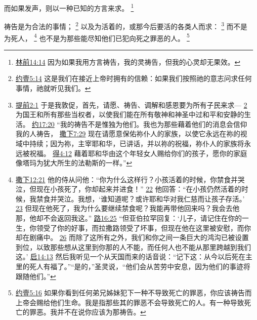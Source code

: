 \documentclass[12pt, a4paper, oneside]{ctexart}
\newcounter{parnum}[section]
\newcommand{\N}{%
   \noindent\refstepcounter{parnum}%
    \makebox[\parindent][l]{\textbf{\arabic{parnum}.}}}
\begin{document}
	而如果发声，则以一种已知的方言来求。
	\footnote {
		\href{https://biblehub.com/1_corinthians/14-14.htm}{林前14:14} 因为如果我用方言祷告，我的灵祷告，但我的心灵却无果效。
	}

\N 祷告是为合法的事情；
	\footnote {
		\href{https://biblehub.com/1_john/5-14.htm}{约壹5:14} 这是我们在接近上帝时拥有的信赖：如果我们按照祂的意志问求任何事情，祂就听见我们。
	}
	以及为活着的，或那今后要活的各类人而求：
	\footnote {
		\href{https://biblehub.com/1_timothy/2-1.htm}{提前2:1} 于是我敦促，首先，请愿、祷告、调解和感恩要为所有子民来求---
		\href{https://biblehub.com/1_timothy/2-2.htm}{2} 为国王和所有那些当权者，以使我们能在所有敬神和神圣中过和平和安静的生活。
		\href{https://biblehub.com/john/17-20.htm}{约17:20} “我的祷告不是惟独为他们。我也为那些藉着他们的消息会信仰我的人祷告，
		\href{https://biblehub.com/2_samuel/7-29.htm}{撒下7:29} 现在请愿意保佑祢仆人的家族，以使它永远在祢的视域中持续；因为祢，主宰耶和华，已讲话，并以祢的祝福，祢仆人的家族将永远被祝福。
		\href{https://biblehub.com/ruth/4-12.htm}{得4:12} 藉着耶和华由这个年轻女人赐给你们的孩子，愿你的家庭像塔玛为犹大所生的法勒斯的一样。”
	}
	而不是为死人，
	\footnote {
		\href{https://biblehub.com/2_samuel/12-21.htm}{撒下12:21} 他的侍从问他：“你为什么这样行？小孩活着的时候，你禁食并哭泣，但现在小孩死了，你却起来并进食！”
		\href{https://biblehub.com/2_samuel/12-22.htm}{22} 他回答：“在小孩仍然活着的时候，我禁食并哭泣。我想，‘谁知道呢？或许耶和华对我仁慈而让孩子存活。’
		\href{https://biblehub.com/2_samuel/12-23.htm}{23} 但现在他死了，我为什么要继续禁食呢？我能再带他回来吗？我会去他那，他却不会返回我这。”
		\href{https://biblehub.com/luke/16-25.htm}{路16:25} “但亚伯拉罕回复：‘儿子，请记住在你的一生，你领受了你的好事，而拉撒路领受了坏事，但现在他在这里被安慰，而你却在剧痛中。
		\href{https://biblehub.com/luke/16-26.htm}{26} 而除了这所有之外，我们和你之间一条巨大的鸿沟已被设置到位，以致那些想从这里到你那的人不能，而任何人也不能从那里跨越到我们这。’
		\href{https://biblehub.com/revelation/14-13.htm}{启14:13} 然后我听见一个从天国而来的话音说：“记下这：从今以后死在主里的死人有福了。”“是的，”圣灵说，“他们会从苦劳中安息，因为他们的事迹将跟随他们。”
	}
	也不是为那些能尽知他们已犯向死之罪恶的人。
	\footnote {
		\href{https://biblehub.com/1_john/5-16.htm}{约壹5:16} 如果你看到任何弟兄姊妹犯下一种不导致死亡的罪恶，你应该祷告而上帝会赐给他们生命。我是指那些其的罪恶不会导致死亡的人。有一种导致死亡的罪恶。我并不在说你应该为那祷告。
	}
\end{document}

